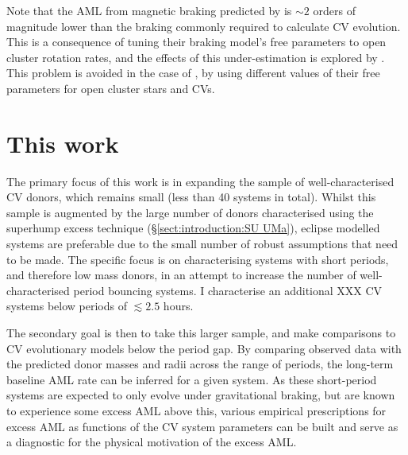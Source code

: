Note that the AML from magnetic braking predicted by \citet{matt2015} is $\sim 2$ orders of magnitude lower than the braking commonly required to calculate CV evolution. This is a consequence of tuning their braking model's free parameters to open cluster rotation rates, and the effects of this under-estimation is explored by \citet{andronov2003}. This problem is avoided in the case of \citet{garraffo2018a,garraffo2018b}, by using different values of their free parameters for open cluster stars and CVs.


\section{This work}
\label{sect:introduction:this work}

The primary focus of this work is in expanding the sample of well-characterised CV donors, which remains small (less than 40 systems in total). Whilst this sample is augmented by the large number of donors characterised using the superhump excess technique (\S\ref{sect:introduction:SU UMa}), eclipse modelled systems are preferable due to the small number of robust assumptions that need to be made. The specific focus is on characterising systems with short periods, and therefore low mass donors, in an attempt to increase the number of well-characterised period bouncing systems. I characterise an additional XXX CV systems below periods of $\lesssim 2.5$ hours.

The secondary goal is then to take this larger sample, and make comparisons to CV evolutionary models below the period gap. By comparing observed data with the predicted donor masses and radii across the range of periods, the long-term baseline AML rate can be inferred for a given system. As these short-period systems are expected to only evolve under gravitational braking, but are known to experience some excess AML above this, various empirical prescriptions for excess AML as functions of the CV system parameters can be built and serve as a diagnostic for the physical motivation of the excess AML. 

